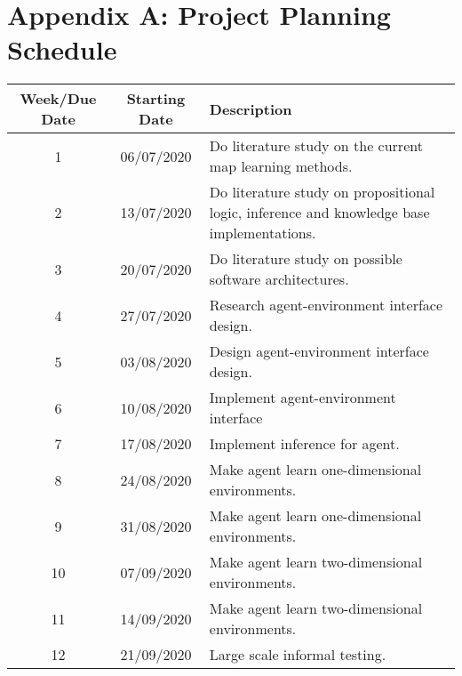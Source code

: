 \setcounter{table}{0}
\renewcommand{\thetable}{A.\arabic{table}}

\chapter{Appendix A:  Project Planning Schedule}

 \begin{table}[H]
  \begin{center}
    \begin{tabular}{|c|c|p{8cm}|} 
    \hline
      \textbf{Week/Due Date} & \textbf{Starting Date} & \textbf{Description}\\
      \hline
      \hline
      1 & 06/07/2020 & Do literature study on the current map learning methods.\\ \hline
      
      2 & 13/07/2020 & Do literature study on propositional logic, 
      inference and knowledge base implementations.\\ \hline
      
      3 & 20/07/2020 & Do literature study on possible software architectures.\\ \hline
      
      4 & 27/07/2020 &  Research agent-environment interface design. \\ \hline
      
      5  & 03/08/2020 & Design agent-environment interface design.  \\ \hline
      
      6 & 10/08/2020 & Implement agent-environment interface\\ \hline
      
      7 & 17/08/2020 & Implement inference for agent. \\ \hline
      
      8 & 24/08/2020 & Make agent learn one-dimensional environments.\\ \hline
      
      9 & 31/08/2020 & Make agent learn one-dimensional environments.\\ \hline
      
      10 & 07/09/2020 & Make agent learn two-dimensional environments.\\ \hline
      
      11 & 14/09/2020 & Make agent learn two-dimensional environments.\\ \hline
      
      12 & 21/09/2020 & Large scale informal testing.\\ \hline
      

\end{tabular}
\end{center}
\end{table}
